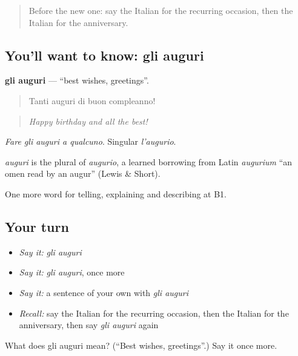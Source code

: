 \begin{quote}
Before the new one: say the Italian for the recurring occasion, then the Italian for the anniversary.
\end{quote}

\subsection*{You'll want to know: gli auguri}
\textbf{gli auguri} — \textquotedblleft{}best wishes, greetings\textquotedblright{}.

\begin{quote}
Tanti auguri di buon compleanno!
\end{quote}

\begin{quote}
\emph{Happy birthday and all the best!}
\end{quote}

\emph{Fare gli auguri a qualcuno}. Singular \emph{l'augurio}.

\begin{cousinweb}
\emph{auguri} is the plural of \emph{augurio}, a learned borrowing from Latin \emph{augurium} \textquotedblleft{}an omen read by an augur\textquotedblright{} (Lewis \& Short).
\end{cousinweb}

\begin{grammarlens}[title={What you've built}]
One more word for telling, explaining and describing at B1.
\end{grammarlens}

\subsection*{Your turn}
\begin{itemize}
\raggedright
  \item \emph{Say it:} \emph{gli auguri}
  \item \emph{Say it:} \emph{gli auguri}, once more
  \item \emph{Say it:} a sentence of your own with \emph{gli auguri}
  \item \emph{Recall:} say the Italian for the recurring occasion, then the Italian for the anniversary, then say \emph{gli auguri} again
\end{itemize}

\begin{tcolorbox}[breakable,colback=teal!4,colframe=teal!35!black,title={Before you move on}]
What does gli auguri mean? (\textquotedblleft{}Best wishes, greetings\textquotedblright{}.) Say it once more.
\end{tcolorbox}
